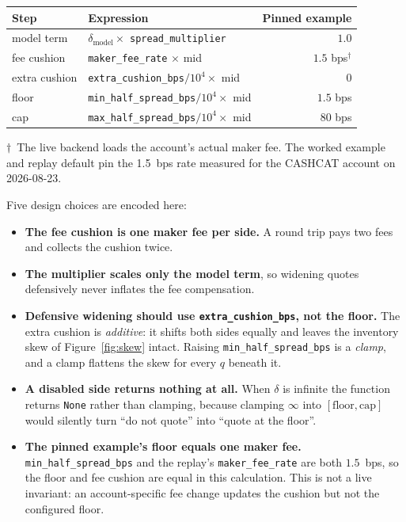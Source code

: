 \documentclass[11pt,a4paper]{article}
\newcommand{\code}[1]{\texttt{\small #1}}
\begin{document}
\begin{center}\small
\begin{tabular}{@{}llr@{}}
\toprule
\textbf{Step} & \textbf{Expression} & \textbf{Pinned example} \\
\midrule
model term    & $\delta_{\text{model}} \times$ \code{spread\_multiplier} & $1.0$ \\
fee cushion   & \code{maker\_fee\_rate} $\times$ mid & $1.5$ bps$^{\dagger}$ \\
extra cushion & \code{extra\_cushion\_bps}$/10^4 \times$ mid & $0$ \\
floor         & \code{min\_half\_spread\_bps}$/10^4 \times$ mid & $1.5$ bps \\
cap           & \code{max\_half\_spread\_bps}$/10^4 \times$ mid & $80$ bps \\
\bottomrule
\end{tabular}
\end{center}

\noindent\small $\dagger$~The live backend loads the account's actual maker fee.
The worked example and replay default pin the 1.5~bps rate measured for the
CASHCAT account on 2026-08-23.\normalsize

Five design choices are encoded here:

\begin{itemize}
  \item \textbf{The fee cushion is one maker fee per side.} A round trip pays two
    fees and collects the cushion twice.
  \item \textbf{The multiplier scales only the model term}, so widening quotes
    defensively never inflates the fee compensation.
  \item \textbf{Defensive widening should use \code{extra\_cushion\_bps}, not the
    floor.} The extra cushion is \emph{additive}: it shifts both sides equally
    and leaves the inventory skew of Figure~\ref{fig:skew} intact. Raising
    \code{min\_half\_spread\_bps} is a \emph{clamp}, and a clamp flattens the
    skew for every $q$ beneath it.
  \item \textbf{A disabled side returns nothing at all.} When $\delta$ is
    infinite the function returns \code{None} rather than clamping, because
    clamping $\infty$ into $[\text{floor},\text{cap}]$ would silently turn ``do
    not quote'' into ``quote at the floor''.
  \item \textbf{The pinned example's floor equals one maker fee.}
    \code{min\_half\_spread\_bps} and the replay's \code{maker\_fee\_rate} are
    both $1.5$~bps, so
    the floor and fee cushion are equal in this calculation. This is not a live
    invariant: an account-specific fee change updates the cushion but not the
    configured floor.
\end{itemize}
\end{document}
